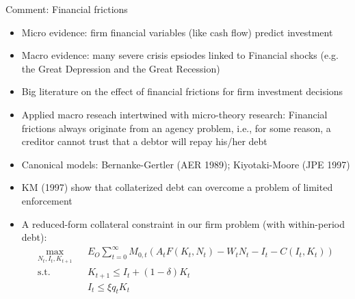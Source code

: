 \documentclass[9pt,xcolor={dvipsnames}]{beamer}
\newcommand{\bit}{\begin{itemize}}
\newcommand{\eit}{\end{itemize}}
\newcommand{\bc}{\color{blue}}
\begin{document}
\begin{frame}{Comment: Financial frictions}

\bit
\setlength\itemsep{1em} 

\item Micro evidence: firm financial variables (like cash flow) predict investment

\item Macro evidence: many severe crisis epsiodes linked to Financial shocks (e.g. the Great Depression and the Great Recession) 

\item Big literature on the effect of financial frictions for firm investment decisions

\item Applied macro reseach intertwined with micro-theory research: Financial frictions always originate from an {\bc agency problem}, i.e., for some reason, a creditor cannot trust that a debtor will repay his/her debt

\item Canonical models: Bernanke-Gertler (AER 1989); Kiyotaki-Moore (JPE 1997)

\item KM (1997) show that collaterized debt can overcome a problem of limited enforcement

\item A reduced-form collateral constraint in our firm problem (with within-period debt):
\begin{eqnarray}
\max_{N_t, I_t, K_{t+1}} && E_O \sum_{t=0}^{\infty} M_{0, t} \left(A_t F(K_t, N_t) - W_t N_t - I_t -C(I_t, K_t) \right) \nonumber \\
\text{s.t.} && K_{t+1} \leq I_t + (1-\delta) K_t \nonumber \\
&& I_t \leq \xi q_t K_{t} \nonumber
\end{eqnarray}


\eit

\end{frame}
\end{document}

